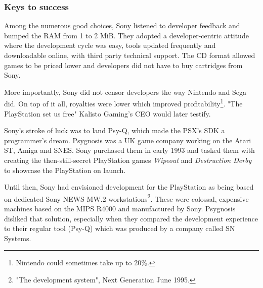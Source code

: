 
\vspace{-20pt}
\subsubsection{Keys to success}
\par
 Among the numerous good choices, Sony listened to developer feedback and bumped the RAM from 1 to 2 MiB. They adopted a developer-centric attitude where the development cycle was easy, tools updated frequently and downloadable online, with third party technical support. The CD format allowed games to be priced lower and developers did not have to buy cartridges from Sony.\\
 \par
  More importantly, Sony did not censor developers the way Nintendo and Sega did. On top of it all, royalties were lower which improved profitability\footnote{Nintendo could sometimes take up to 20\%.}. "The PlayStation set us free" Kalisto Gaming's CEO would later testify.\\
\par
Sony's stroke of luck was to land Psy-Q, which made the PSX's SDK a programmer's dream. Psygnosis was a UK game company working on the Atari ST, Amiga and SNES. Sony purchased them in early 1993 and tasked them with creating the then-still-secret PlayStation games \textit{Wipeout} and \textit{Destruction Derby} to showcase the PlayStation on launch.\\
\par
Until then, Sony had envisioned development for the PlayStation as being based on dedicated Sony NEWS MW.2 workstations\footnote{"The development system", Next Generation June 1995.}. These were colossal, expensive machines based on the MIPS R4000 and manufactured by Sony. Psygnosis disliked that solution, especially when they compared the development experience to their regular tool (Psy-Q) which was produced by a company called SN Systems.\\

